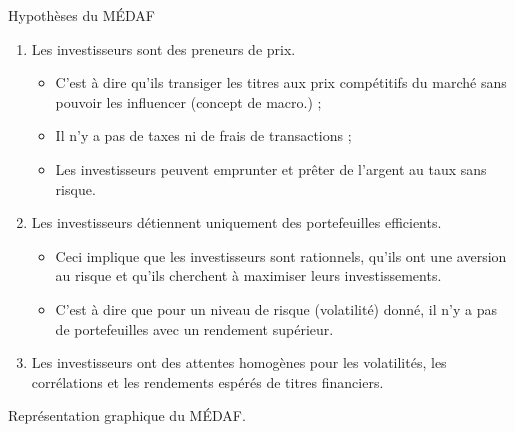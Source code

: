 \documentclass[10pt, french]{article}
\begin{document}
\begin{multicols*}{2}
\begin{conceptgen}{Hypothèses du MÉDAF}
\begin{enumerate}
	\item	Les investisseurs sont des preneurs de prix.
		\begin{itemize}
		\item	C'est à dire qu'ils transiger les titres aux prix compétitifs du marché sans pouvoir les influencer (concept de macro.) ;
		\item	Il n'y a pas de taxes ni de frais de transactions ;
		\item	Les investisseurs peuvent emprunter et prêter de l'argent au taux sans risque.
		\end{itemize}
	\item	Les investisseurs détiennent uniquement des portefeuilles efficients.
		\begin{itemize}
		\item	Ceci implique que les investisseurs sont rationnels, qu’ils ont une aversion au risque et qu'ils cherchent à maximiser leurs investissements.
		\item	C'est à dire que pour un niveau de risque (volatilité) donné, il n'y a pas de portefeuilles avec un rendement supérieur. 
		\end{itemize}
	\item	Les investisseurs ont des attentes homogènes pour les volatilités, les corrélations et les rendements espérés de titres financiers.
\end{enumerate}
\end{conceptgen}

\begin{definitionNOHFILLsub}
Représentation graphique du MÉDAF.

\begin{center}

\begin{tikzpicture}[x=0.75pt,y=0.75pt,yscale=-1,xscale=1]


\end{tikzpicture}
\end{center}
\end{definitionNOHFILLsub}
\end{multicols*}
\end{document}

